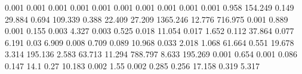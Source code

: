 0.001      0.001      %
0.001      0.001      %
0.001      0.001      %
0.001      0.001      %
0.001      0.001      %
0.958      154.249    %
0.149      29.884     %
0.694      109.339    %
0.388      22.409     %
27.209     1365.246   %
12.776     716.975    %
0.001      0.889      %
0.001      0.155      %
0.003      4.327      %
0.003      0.525      %
0.018      11.054     %
0.017      1.652      %
0.112      37.864     %
0.077      6.191      %
0.03       6.909      %
0.008      0.709      %
0.089      10.968     %
0.033      2.018      %
1.068      61.664     %
0.551      19.678     %
3.314      195.136    %
2.583      63.713     %
11.294     788.797    %
8.633      195.269    %
0.001      0.654      %
0.001      0.086      %
0.147      14.1       %
0.27       10.183     %
0.002      1.55       %
0.002      0.285      %
0.256      17.158     %
0.319      5.317      %
